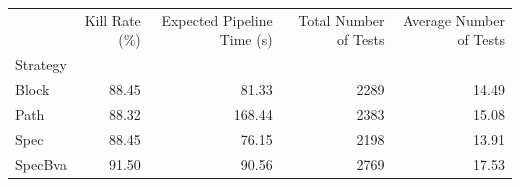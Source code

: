 \begin{tabular}{lrrrr}
\toprule
 & Kill Rate (\%) & Expected Pipeline Time (s) & Total Number of Tests & Average Number of Tests \\
Strategy &  &  &  &  \\
\midrule
Block & 88.45 & 81.33 & 2289 & 14.49 \\
Path & 88.32 & 168.44 & 2383 & 15.08 \\
Spec & 88.45 & 76.15 & 2198 & 13.91 \\
SpecBva & 91.50 & 90.56 & 2769 & 17.53 \\
\bottomrule
\end{tabular}
